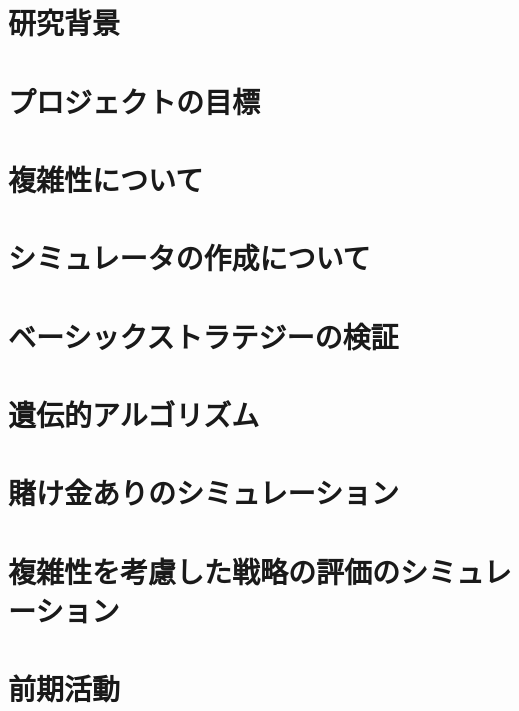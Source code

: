 \documentclass[11pt,a4paper,oneside]{jsbook}
\begin{document}
\tableofcontents
\newpage


\chapter{研究背景}






\chapter{プロジェクトの目標}

\chapter{複雑性について}


\chapter{シミュレータの作成について}


\chapter{ベーシックストラテジーの検証}




\chapter{遺伝的アルゴリズム}



\chapter{賭け金ありのシミュレーション}



\chapter{複雑性を考慮した戦略の評価のシミュレーション}

\chapter{前期活動}

%
\end{document}
